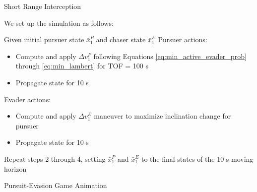 \begin{frame}{Short Range Interception} 

    We set up the simulation as follows: 

    \begin{algorithm}[H]
    \begin{algorithmic}[1]
        \STATE Given initial pursuer state $ \bar{x}_1^P $ and chaser state $ \bar{x}_1^E $ 
        \STATE Pursuer actions: 
        \begin{itemize}
            \item Compute and apply $ \Delta v_1^P $ following Equations \ref{eq:min_active_evader_prob} through \ref{eq:min_lambert} for TOF = 100 s 
            \item Propagate state for 10 s 
        \end{itemize} 
        \STATE Evader actions: 
        \begin{itemize}
            \item Compute and apply $ \Delta v_1^E $ maneuver to maximize inclination change for pursuer 
            \item Propagate state for 10 s 
        \end{itemize} 
        \STATE Repeat steps 2 through 4, setting $ \bar{x}_1^P $ and $ \bar{x}_1^E $ to the final states of the 10 s moving horizon 
        \end{algorithmic}
    \caption{Pursuit Evasion Game}
    \label{alg:seq}
    \end{algorithm}
% 
    
\end{frame}

\begin{frame}{Pursuit-Evasion Game Animation}

    \centering

    
\end{frame}


